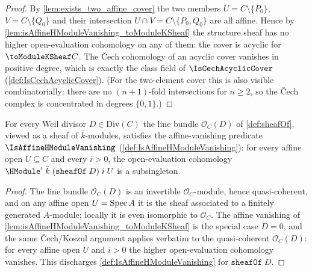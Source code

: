 \begin{proof}
  By \cref{lem:exists_two_affine_cover} the two members
  \(U = C \setminus \{P_0\}\), \(V = C \setminus \{Q_0\}\) and their
  intersection \(U \cap V = C \setminus \{P_0, Q_0\}\) are all affine.
  Hence by \cref{lem:isAffineHModuleVanishing_toModuleKSheaf} the
  structure sheaf has no higher open-evaluation cohomology on any of
  them: the cover is acyclic for \(\toModuleKSheaf C\). The Čech
  cohomology of an acyclic cover vanishes in positive degree, which is
  exactly the class field of \(\IsCechAcyclicCover\)
  (\cref{def:IsCechAcyclicCover}). (For the two-element cover this is also
  visible combinatorially: there are no \((n{+}1)\)-fold intersections for
  \(n \ge 2\), so the Čech complex is concentrated in degrees
  \(\{0, 1\}\).)
\end{proof}

\begin{lemma}
  \label{lem:isAffineHModuleVanishing_sheafOf}
  For every Weil divisor \(D \in \mathrm{Div}(C)\) the line bundle
  \(\mathcal O_C(D)\) of \cref{def:sheafOf}, viewed as a sheaf of
  \(\bar k\)-modules, satisfies the affine-vanishing predicate
  \(\IsAffineHModuleVanishing\) (\cref{def:IsAffineHModuleVanishing}): for
  every affine open \(U \subseteq C\) and every \(i > 0\), the
  open-evaluation cohomology
  \(\HModule'\;\bar k\;(\mathtt{sheafOf}\;D)\;i\;U\) is a subsingleton.
\end{lemma}

\begin{proof}
  The line bundle \(\mathcal O_C(D)\) is an invertible
  \(\mathcal O_C\)-module, hence quasi-coherent, and on any affine open
  \(U = \operatorname{Spec} A\) it is the sheaf associated to a finitely generated
  \(A\)-module; locally it is even isomorphic to \(\mathcal O_C\). The
  affine vanishing of \cref{lem:isAffineHModuleVanishing_toModuleKSheaf}
  is the special case \(D = 0\), and the same Čech/Koszul argument applies
  verbatim to the quasi-coherent \(\mathcal O_C(D)\): for every affine
  open \(U\) and \(i > 0\) the higher open-evaluation cohomology vanishes.
  This discharges \cref{def:IsAffineHModuleVanishing} for
  \(\mathtt{sheafOf}\;D\).
\end{proof}

